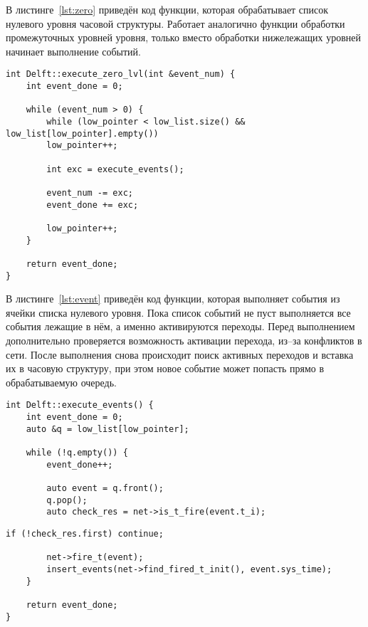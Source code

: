 В листинге~\ref{lst:zero} приведён код функции, которая обрабатывает список нулевого уровня часовой структуры. Работает аналогично функции обработки промежуточных уровней уровня, только вместо обработки нижележащих уровней начинает выполнение событий.
\clearpage

\begin{center}
	\captionsetup{justification=raggedright,singlelinecheck=off}
	\begin{lstlisting}[label=lst:zero,caption=Функция обработки нижнего списка,showstringspaces=false]
int Delft::execute_zero_lvl(int &event_num) {
	int event_done = 0;
	
	while (event_num > 0) {
		while (low_pointer < low_list.size() && low_list[low_pointer].empty())
		low_pointer++;
		
		int exc = execute_events();
		
		event_num -= exc;
		event_done += exc;
		
		low_pointer++;
	}
	
	return event_done;
}	
	\end{lstlisting}
\end{center}
\FloatBarrier

В листинге~\ref{lst:event} приведён код функции, которая выполняет события из ячейки списка нулевого уровня. Пока список событий не пуст выполняется все события лежащие в нём, а именно активируются переходы. Перед выполнением дополнительно проверяется возможность активации перехода, из--за конфликтов в сети. После выполнения снова происходит поиск активных переходов и вставка их в часовую структуру, при этом новое событие может попасть прямо в обрабатываемую очередь.

\begin{center}
	\captionsetup{justification=raggedright,singlelinecheck=off}
	\begin{lstlisting}[label=lst:event,caption=Функция выполнения событий,showstringspaces=false]
int Delft::execute_events() {
	int event_done = 0;
	auto &q = low_list[low_pointer];
	
	while (!q.empty()) {
		event_done++;
		
		auto event = q.front();
		q.pop();
		auto check_res = net->is_t_fire(event.t_i);
	\end{lstlisting}
\end{center}
\FloatBarrier

\begin{center}
	\captionsetup{justification=raggedright,singlelinecheck=off}
	\begin{lstlisting}[label=lst:event2,title=Продолжение листинга \ref{lst:event} ,showstringspaces=false,firstnumber=11]
		if (!check_res.first) continue;
		
		net->fire_t(event);
		insert_events(net->find_fired_t_init(), event.sys_time);
	}
	
	return event_done;
}
	\end{lstlisting}
\end{center}
\FloatBarrier


